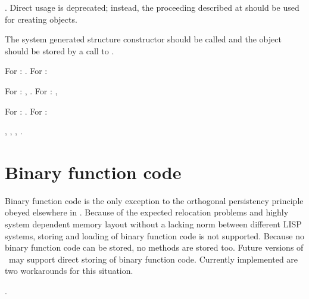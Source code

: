 \begin{RefList}\itemsep0pt

  \Allocator {}. Direct usage is deprecated;
  instead, the proceeding described at \textbf{\CreatorLabel} should
  be used for creating objects.

  \Creator The system generated structure constructor should be called
  and the object should be stored by a call to .

  \TypePredicate {}

  \SlotReader For \lwcl: . For \allegrocl:

  \SlotWriter For \lwcl: ,
  .  For \allegrocl: , 

 \Information For \lwcl: . For \allegrocl:

\end{RefList}

%
,
%
,
%
,
%
.


\section{Binary function code}%
\label{sec:BinaryCode}

Binary function code is the only exception to the orthogonal persistency
principle obeyed elsewhere in \plobwoexcl. Because of the expected
relocation problems and highly system dependent memory layout without
a lacking norm between different LISP systems, storing and loading of
binary function code is not supported.  Because no binary function
code can be stored, no methods are stored too. Future versions of
\plob\ may support direct storing of binary function code. Currently
implemented are two workarounds for this situation.

 {}.

